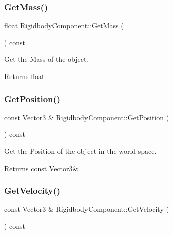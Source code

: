 \subsubsection{\texorpdfstring{Get\+Mass()}{GetMass()}}
{\footnotesize\ttfamily float Rigidbody\+Component\+::\+Get\+Mass (\begin{DoxyParamCaption}{ }\end{DoxyParamCaption}) const}



Get the Mass of the object. 

\begin{DoxyReturn}{Returns}
float 
\end{DoxyReturn}
\mbox{\label{classRigidbodyComponent_a6e0c112dd206b2f4cfe90941aeab110f}} 
\subsubsection{\texorpdfstring{Get\+Position()}{GetPosition()}}
{\footnotesize\ttfamily const Vector3 \& Rigidbody\+Component\+::\+Get\+Position (\begin{DoxyParamCaption}{ }\end{DoxyParamCaption}) const}



Get the Position of the object in the world space. 

\begin{DoxyReturn}{Returns}
const Vector3\& 
\end{DoxyReturn}
\mbox{\label{classRigidbodyComponent_a11febd70a9d94963f6f7daf2f521b091}} 
\subsubsection{\texorpdfstring{Get\+Velocity()}{GetVelocity()}}
{\footnotesize\ttfamily const Vector3 \& Rigidbody\+Component\+::\+Get\+Velocity (\begin{DoxyParamCaption}{ }\end{DoxyParamCaption}) const}



